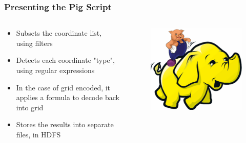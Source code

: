 \documentclass[hyperref={pdfpagelabels=true}]{beamer}
\begin{document}
\begin{frame}
\frametitle{Presenting the Pig Script}
\begin{columns}
  \begin{column}{0.5\textwidth}
    \begin{itemize}
      \item<1->Subsets the coordinate list, using filters
      \item<1->Detects each coordinate "type", using regular expressions
      \item<1->In the case of grid encoded, it applies a formula to decode back into grid
      \item<1->Stores the results into separate files, in HDFS  
    \end{itemize}
  \end{column}  
  \begin{column}{0.5\textwidth}
      \begin{figure}  
	\includegraphics[width=\textwidth]{pig-on-elephant.png}
       \end{figure}  
  \end{column}  
\end{columns}
\end{frame}
\end{document}
